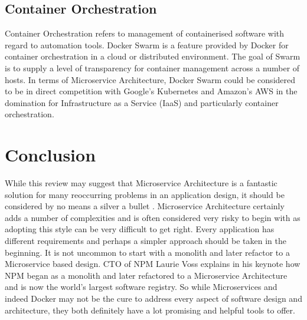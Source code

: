 \documentclass[journal]{IEEEtran}
\begin{document}
\subsection*{Container Orchestration}
Container Orchestration refers to management of containerised software with regard to automation tools. Docker Swarm \cite{dockerswarm} is a feature provided by Docker for container orchestration in a cloud or distributed environment. The goal of Swarm is to supply a level of transparency for container management across a number of hosts.  
In terms of Microservice Architecture, Docker Swarm could be considered to be in direct competition with Google's Kubernetes \cite{swarmkubernetes} and Amazon's AWS in the domination for Infrastructure as a Service (IaaS) and particularly container orchestration.

\section{Conclusion}
While this review may suggest that Microservice Architecture is a fantastic solution for many reoccurring problems in an application design, it should be considered by no means a silver a bullet \cite{BuildingMicroServices}. Microservice Architecture certainly adds a number of complexities and is often considered very risky to begin with as adopting this style can be very difficult to get right. Every application has different requirements and perhaps a simpler approach should be taken in the beginning. It is not uncommon to start with a monolith and later refactor to a Microservice based design. CTO of NPM Laurie Voss explains in his keynote how NPM began as a monolith and later refactored to a Microservice Architecture and is now the world's largest software registry\cite{npm}. So while Microservices and indeed Docker may not be the cure to address every aspect of software design and architecture, they both definitely have a lot promising and helpful tools to offer.

\newpage
\printbibliography

\end{document}
